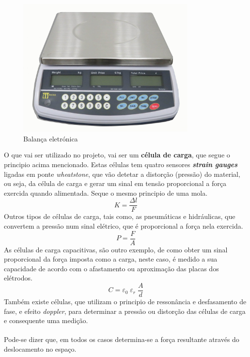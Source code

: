 \\
\begin{figure}[H]
	\centering
	\includegraphics[height=7cm]{./image/PESTA/general/Scale_1.jpg}
	\caption{Balança eletrónica}
	\label{Scale_1}
\end{figure}
O que vai ser utilizado no projeto, vai ser um \textbf{célula de carga}, que segue o principio acima mencionado. Estas células tem quatro sensores \textit{\textbf{strain gauges}} ligadas em ponte \textit{wheatstone}, que vão detetar a distorção (pressão) do material, ou seja, da célula de carga e gerar um sinal em tensão proporcional a força exercida quando alimentada. Seque o mesmo principio de uma mola.
\begin{equation}
	\label{eq:Hooke}
	K = \frac{\Delta l}{F}
\end{equation}
Outros tipos de células de carga, tais como, as pneumáticas e hidráulicas, que convertem a pressão num sinal elétrico, que é proporcional a força nela exercida.
\begin{equation}
	\label{eq:Preasure}
	P = \frac{F}{A}
\end{equation}
As células de carga capacitivas, são outro exemplo, de como obter um sinal proporcional da força imposta como a carga, neste caso, é medido a sua capacidade de acordo com o afastamento ou aproximação das placas dos elétrodos.
\begin{equation}
	\label{eq:Capacity}
	C = \varepsilon_{0} \; \varepsilon_{r} \; \frac{A}{d}
\end{equation}
Também existe células, que utilizam o principio de ressonância e desfasamento de fase, e efeito \textit{doppler}, para determinar a pressão ou distorção das células de carga e consequente uma medição.
\\
\\
Pode-se dizer que, em todos os casos determina-se a força resultante através do deslocamento no espaço.
